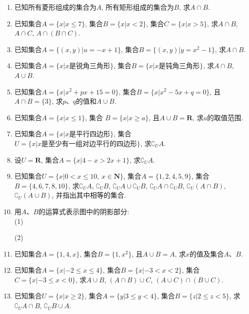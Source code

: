 \documentclass[10pt,a4paper]{article}
\begin{document}
\begin{enumerate}[1.]
\item 已知所有菱形组成的集合为$A$, 所有矩形组成的集合为$B$, 求$A\cap B$.
\item 已知集合$A=\{x|x\le 7\}$, 集合$B=\{x|x<2\}$, 集合$C=\{x|x>5\}$, 求$A\cap B$, $A\cap C$, $A\cap (B\cap C)$.
\item 已知集合$A=\{(x,y)|u=-x+1\}$, 集合$B=\{(x,y)|y=x^2-1\}$, 求$A\cap B$.
\item 已知集合$A=\{x|x\text{是锐角三角形}\}$, 集合$B=\{x|x\text{是钝角三角形}\}$, 求$A\cap B$, $A\cup B$.
\item 已知集合$A=\{x|x^2+px+15=0\}$, 集合$B=\{x|x^2-5x+q=0\}$, 且$A\cap B=\{3\}$, 求$p$、$q$的值和$A\cup B$.
\item 已知集合$A=\{x|x\le 1\}$, 集合 $B=\{x|x\ge a\}$, 且$A\cup B=\mathbf{R}$, 求$a$的取值范围.
\item 已知集合$A=\{x|x\text{是平行四边形}\}$, 集合$U=\{x|x\text{是至少有一组对边平行的四边形}\}$, 求$\complement _UA$.
\item 设$U=\mathbf{R}$, 集合$A=\{x|4-x>2x+1\}$, 求$\complement _UA$.
\item 已知集合$U=\{x|0<x\le 10, \ x\in \mathbf{N}\}$, 集合$A=\{1,2,4,5,9\}$, 集合$B=\{4,6,7,8,10\}$, 求$\complement _UA$, $\complement _UB$, $\complement _UA\cup \complement _UB$, $\complement _UA\cap \complement _UB$, $\complement _U(A\cap B)$, $\complement _U(A\cup B)$, 并指出其中相等的集合.
\item 用$A$、$B$的运算式表示图中的阴影部分:\\
(1)  (2) 
\item 已知集合$A=\{1,4,x\}$, 集合$B=\{1,x^2\}$, 且$A\cup B=A$, 求$x$的值及集合$A$、$B$.
\item 已知集合$A=\{x|-2\le x\le 4\}$, 集合$B=\{x|-3<x<2\}$, 集合$C=\{x|-3\le x<0\}$, 求$A\cup B$, $(A\cap B)\cup C$, $(A\cup C)\cap (B\cup C)$.
\item 已知集合$U=\{x|x\ge 2\}$, 集合$A=\{y|3\le y<4\}$, 集合$B=\{z|2\le z<5\}$, 求$\complement _UA\cap B$, $\complement _UB\cup A$.

\end{enumerate}
\end{document}
